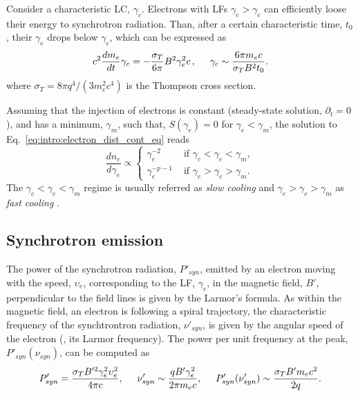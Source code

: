 Consider a characteristic \ac{LC}, $\gamma_c$. 
Electrons with \acp{LF} $\gamma_e > \gamma_c$ can efficiently loose their energy to 
synchrotron radiation. Than, after a certain characteristic time, $t_0$, 
their $\gamma_e$ drops below $\gamma_c$, which can be expressed as
%
\begin{equation}
c^2 \frac{dm_e}{dt} \gamma_e = -\frac{\sigma_T}{6\pi} B^2 \gamma_e^2 c\, ,
\hspace{5mm}
\gamma_c \sim \frac{6 \pi m_e c}{\sigma_T B^2 t_0}.
\end{equation}
%
where $\sigma_T = 8\pi q^4 / (3m_e^2c^4)$ is the Thompson cross section.


Assuming that the injection of electrons is constant (steady-state solution,
$\partial_t = 0$), and has a minimum, $\gamma_m$, such that, 
$S(\gamma_e) = 0$ for $\gamma_e < \gamma_m$, the solution to  Eq.~\eqref{eq:intro:electron_dist_cont_eq} reads 
%
\begin{equation}
\frac{dn_e}{d\gamma_e} \propto 
\begin{cases}
\gamma_e^{-2} &\text{ if } \gamma_c < \gamma_e < \gamma_m, \\
\gamma_e^{-p-1} &\text{ if } \gamma_e > \gamma_c > \gamma_m. 
\end{cases}
\label{eq:afterglow:elec_dist}
\end{equation}
%
The $\gamma_c < \gamma_e < \gamma_m$ regime is usually referred as 
\textit{slow cooling} and $\gamma_e > \gamma_c > \gamma_m$ as \textit{fast cooling} 
\citep{Sari:1997qe}.





\subsection{Synchrotron emission}

The power of the synchrotron radiation, $P'_{syn}$, emitted by an electron moving with 
the speed, $\upsilon_e$, corresponding to the \ac{LF}, $\gamma_e$, 
in the magnetic field, $B'$, perpendicular to the field lines is given by the Larmor's formula.
%
As within the magnetic field, an electron is following a spiral trajectory,
the characteristic frequency of the synchtrontron radiation, $\nu'_{syn}$, is given 
by the angular speed of the electron (\eg, its Larmor frequency).
%
The power per unit frequency at the peak, $P'_{syn}(\nu_{syn})$, can be computed as 
\citep{RybickiLightman:1985}
%
\begin{equation}
P'_{syn} = \frac{\sigma_T B'^2\gamma_e^2\upsilon_e^2}{4\pi c}, 
\hspace{5mm} 
\nu'_{syn} \sim \frac{q B' \gamma_e^2}{2\pi m_e c},
\hspace{5mm}
P'_{syn}(\nu_{syn}') \sim \frac{\sigma_T B' m_e c^2}{2 q}.
\end{equation}
%


